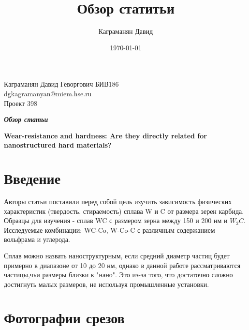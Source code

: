 \documentclass[a4paper, 14pt]{article}
\author{Каграманян Давид}
\title{Обзор статитьи}
\date{\today}
\begin{document}
	\thispagestyle{empty}
\hfill\begin{minipage}{0.4\textwidth}
	Каграманян Давид Геворгович БИВ186\\
	dgkagramanyan@miem.hse.ru\\
	Проект 398\\
	
\end{minipage}%

\begin{center}
	
	
	\textbf{\textit{Обзор статьи}}
	
	\vspace{1ex}
	
	\textbf{Wear-resistance and hardness: Are they directly related for nanostructured hard materials?}
	
	
\end{center}

	\section{Введение}
	Авторы статьи поставили перед собой цель изучить зависимость физических характеристик  (твердость, стираемость) сплава W и C от размера зерен карбида. Образцы для изучения - сплав WC с размером зерна между 150 и 200 нм и
	 $W_2C$.
	Исследуемые комбинации: 
	 WC-Co, W-Co-C с различным содержанием вольфрама и углерода. 
	 
	Сплав можно назвать наноструктурным, если средний диаметр 
	частиц будет примерно в диапазоне от 10 до 20 нм, однако в данной работе рассматриваются частицы,чьи размеры близки к "нано". Это из-за того, что достаточно сложно достигнуть малых размеров, не используя промышленные установки. 
	
	 
	\section{Фотографии срезов}
		
\end{document}
